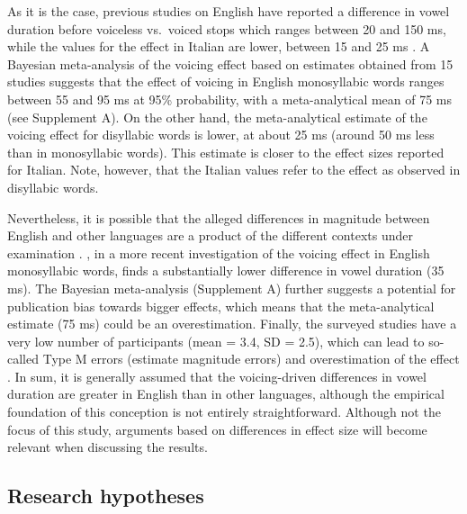 \documentclass[12pt,a4paper,]{article}
\begin{document}
As it is the case, previous studies on English have reported a
difference in vowel duration before voiceless vs.~voiced stops which
ranges between 20 and 150 ms, while the values for the effect in Italian
are lower, between 15 and 25 ms
\citep{caldognetto1979, farnetani1986, esposito2002, coretta2019k}. A
Bayesian meta-analysis of the voicing effect based on estimates obtained
from 15 studies suggests that the effect of voicing in English
monosyllabic words ranges between 55 and 95 ms at 95\% probability, with
a meta-analytical mean of 75 ms (see Supplement A). On the other hand,
the meta-analytical estimate of the voicing effect for disyllabic words
is lower, at about 25 ms (around 50 ms less than in monosyllabic words).
This estimate is closer to the effect sizes reported for Italian. Note,
however, that the Italian values refer to the effect as observed in
disyllabic words.

Nevertheless, it is possible that the alleged differences in magnitude
between English and other languages are a product of the different
contexts under examination \citep{laeufer1992}. \citet{ko2018}, in a
more recent investigation of the voicing effect in English monosyllabic
words, finds a substantially lower difference in vowel duration (35 ms).
The Bayesian meta-analysis (Supplement A) further suggests a potential
for publication bias towards bigger effects, which means that the
meta-analytical estimate (75 ms) could be an overestimation. Finally,
the surveyed studies have a very low number of participants (mean = 3.4,
SD = 2.5), which can lead to so-called Type M errors (estimate magnitude
errors) and overestimation of the effect
\citep{kirby2018, roettger2019}. In sum, it is generally assumed that
the voicing-driven differences in vowel duration are greater in English
than in other languages, although the empirical foundation of this
conception is not entirely straightforward. Although not the focus of
this study, arguments based on differences in effect size will become
relevant when discussing the results.

\hypertarget{research-hypotheses}{%
\subsection{Research hypotheses}\label{research-hypotheses}}

\label{s:hypo}
\end{document}
